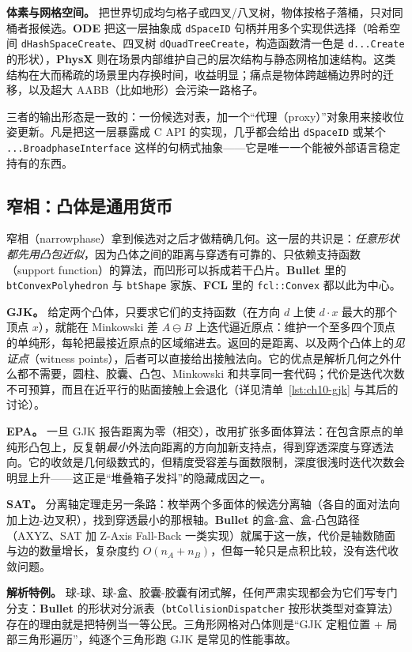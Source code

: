 \documentclass[12pt,a4paper,fontset=fandol]{ctexbook}
\newcommand{\Tp}[1]{\texttt{#1}}
\newcommand{\Bk}{\allowbreak}
\newcommand{\Lib}[1]{\textbf{#1}}
\begin{document}
\textbf{体素与网格空间。} 把世界切成均匀格子或四叉/八叉树，物体按格子落桶，只对同桶者报候选。\Lib{ODE} 把这一层抽象成 \Tp{dSpaceID} 句柄并用多个实现供选择（哈希空间 \Tp{dHash\Bk Space\Bk Create}、四叉树 \Tp{dQuad\Bk Tree\Bk Create}，构造函数清一色是 \Tp{d...Create} 的形状），\Lib{PhysX} 则在场景内部维护自己的层次结构与静态网格加速结构。这类结构在大而稀疏的场景里内存换时间，收益明显；痛点是物体跨越桶边界时的迁移，以及超大 AABB（比如地形）会污染一路格子。

三者的输出形态是一致的：一份候选对表，加一个``代理（proxy）''对象用来接收位姿更新。凡是把这一层暴露成 C API 的实现，几乎都会给出 \Tp{dSpaceID} 或某个 \Tp{...BroadphaseInterface} 这样的句柄式抽象——它是唯一一个能被外部语言稳定持有的东西。

\subsection{窄相：凸体是通用货币}

窄相（narrowphase）拿到候选对之后才做精确几何。这一层的共识是：\emph{任意形状都先用凸包近似}，因为凸体之间的距离与穿透有可靠的、只依赖支持函数（support function）的算法，而凹形可以拆成若干凸片。\Lib{Bullet} 里的 \Tp{bt\Bk Convex\Bk Polyhedron} 与 \Tp{bt\Bk Shape} 家族、\Lib{FCL} 里的 \Tp{fcl::\Bk Convex} 都以此为中心。

\textbf{GJK。} 给定两个凸体，只要求它们的支持函数（在方向 $d$ 上使 $d \cdot x$ 最大的那个顶点 $x$），就能在 Minkowski 差 $A\ominus B$ 上迭代逼近原点：维护一个至多四个顶点的单纯形，每轮把最接近原点的区域缩进去。返回的是距离、以及两个凸体上的\emph{见证点}（witness points），后者可以直接给出接触法向。它的优点是解析几何之外什么都不需要，圆柱、胶囊、凸包、Minkowski 和共享同一套代码；代价是迭代次数不可预算，而且在近平行的贴面接触上会退化（详见清单~\ref{lst:ch10-gjk} 与其后的讨论）。

\textbf{EPA。} 一旦 GJK 报告距离为零（相交），改用扩张多面体算法：在包含原点的单纯形凸包上，反复朝\emph{最小}外法向距离的方向加新支持点，得到穿透深度与穿透法向。它的收敛是几何级数式的，但精度受容差与面数限制，深度很浅时迭代次数会明显上升——这正是``堆叠箱子发抖''的隐藏成因之一。

\textbf{SAT。} 分离轴定理走另一条路：枚举两个多面体的候选分离轴（各自的面对法向加上边-边叉积），找到穿透最小的那根轴。\Lib{Bullet} 的盒-盒、盒-凸包路径（AXYZ、SAT 加 Z-Axis Fall-Back 一类实现）就属于这一族，代价是轴数随面与边的数量增长，复杂度约 $O(n_{A}+n_{B})$，但每一轮只是点积比较，没有迭代收敛问题。

\textbf{解析特例。} 球-球、球-盒、胶囊-胶囊有闭式解，任何严肃实现都会为它们写专门分支：\Lib{Bullet} 的形状对分派表（\Tp{bt\Bk Collision\Bk Dispatcher} 按形状类型对查算法）存在的理由就是把特例当一等公民。三角形网格对凸体则是``GJK 定粗位置 + 局部三角形遍历''，纯逐个三角形跑 GJK 是常见的性能事故。
\end{document}
